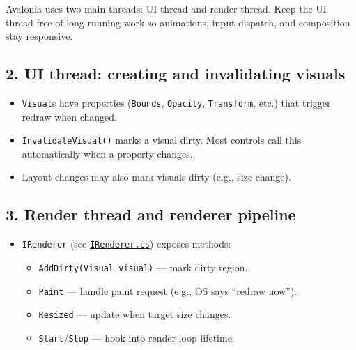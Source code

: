 Avalonia uses two main threads: UI thread and render thread. Keep the UI
thread free of long-running work so animations, input dispatch, and
composition stay responsive.

\subsection{2. UI thread: creating and invalidating
visuals}\label{ui-thread-creating-and-invalidating-visuals}

\begin{itemize}
\tightlist
\item
  \passthrough{\lstinline!Visual!}s have properties
  (\passthrough{\lstinline!Bounds!}, \passthrough{\lstinline!Opacity!},
  \passthrough{\lstinline!Transform!}, etc.) that trigger redraw when
  changed.
\item
  \passthrough{\lstinline!InvalidateVisual()!} marks a visual dirty.
  Most controls call this automatically when a property changes.
\item
  Layout changes may also mark visuals dirty (e.g., size change).
\end{itemize}

\subsection{3. Render thread and renderer
pipeline}\label{render-thread-and-renderer-pipeline}

\begin{itemize}
\tightlist
\item
  \passthrough{\lstinline!IRenderer!} (see
  \href{https://github.com/AvaloniaUI/Avalonia/blob/master/src/Avalonia.Base/Rendering/IRenderer.cs}{\passthrough{\lstinline!IRenderer.cs!}})
  exposes methods:

  \begin{itemize}
  \tightlist
  \item
    \passthrough{\lstinline!AddDirty(Visual visual)!} --- mark dirty
    region.
  \item
    \passthrough{\lstinline!Paint!} --- handle paint request (e.g., OS
    says ``redraw now'').
  \item
    \passthrough{\lstinline!Resized!} --- update when target size
    changes.
  \item
    \passthrough{\lstinline!Start!}/\passthrough{\lstinline!Stop!} ---
    hook into render loop lifetime.
  \end{itemize}
\end{itemize}

